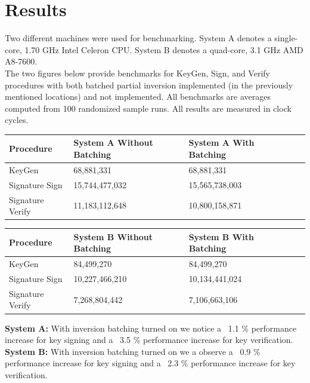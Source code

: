 \section{Results}

Two different machines were used for benchmarking. System A denotes a single-core, 1.70 GHz Intel Celeron CPU. System B denotes a quad-core, 3.1 GHz AMD A8-7600.\\

The two figures below provide benchmarks for KeyGen, Sign, and Verify procedures with both batched partial inversion implemented (in the previously mentioned locations) and not implemented. All benchmarks are averages computed from 100 randomized sample runs. All results are measured in clock cycles.

\begin{center}
\begin{tabular}{@{}lllll@{}}
	\toprule
	Procedure & System A Without Batching & System A With Batching\\
	\midrule
	KeyGen & 68,881,331 & 68,881,331\\
	Signature Sign & 15,744,477,032 & 15,565,738,003\\
	Signature Verify & 11,183,112,648 & 10,800,158,871\\
	\bottomrule
\end{tabular}
\end{center}

\begin{center}
\begin{tabular}{@{}lllll@{}}
	\toprule
	Procedure & System B Without Batching & System B With Batching\\
	\midrule
	KeyGen & 84,499,270 & 84,499,270\\
	Signature Sign & 10,227,466,210 & 10,134,441,024\\
	Signature Verify & 7,268,804,442 & 7,106,663,106\\
	\bottomrule
\end{tabular}
\end{center}

\textbf{System A:} With inversion batching turned on we notice a ~1.1 \% performance increase for key signing and a ~3.5 \% performance increase for key verification.\\

\textbf{System B:} With inversion batching turned on we a observe a ~0.9 \% performance increase for key signing and a ~2.3 \% performance increase for key verification.\\

